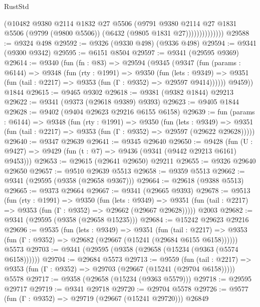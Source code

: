 \begin{lexlean}{RustStd}
\begin{coremodule}
                        (@10482
                          @9380
                          @2114
                          @1832
                          @27
                          @5506
                          (@9791
                            @9380
                            @2114
                            @27
                            @1831
                            @5506
                            (@9799 (@9800 @5506))
                            (@6432 (@9805 @1831 @27))))))))))))))
@29588 := @9324 @498
@29592 := @9326 (@9330 @498) (@9336 @498)
@29594 := @9341 (@9300 @9342)
@29595 := @6151 @8504
@29597 := @9341 (@29595 @9369)
@29614 := @9340
    (fun (fn : @83) =>
    @29594
      (@9345
        (@9347
          (fun (params : @6144) =>
          @9348
            (fun (rty : @1991) =>
            @9350
              (fun (lets : @9349) =>
              @9351 (fun (tail : @2217) => @9353 (fun (Γ : @9352) => @29597 @9414))))))
        @9459))
    @1844
@29615 := @9465 @9302
@29618 := @9381 (@9382 @1844) @29213
@29622 := @9341 (@9373 (@29618 @9389) @9393)
@29623 := @9405 @1844
@29628 := @9402 (@9404 @29623 @29216 @6155 @6158)
@29639 := fun (params : @6144) =>
  @9348
    (fun (rty : @1991) =>
    @9350
      (fun (lets : @9349) =>
      @9351 (fun (tail : @2217) => @9353 (fun (Γ : @9352) => @29597 (@29622 @29628)))))
@29640 := @9347 @29639
@29641 := @9345 @29640
@29650 := @9428
    (fun (U : @9427) => @9429 (fun (t : @7) => @9436 (@9341 (@9442 @29213 @6161) @9453)))
@29653 := @29615 (@29641 @29650) @29211
@29655 := @9326 @29640 @29650
@29657 := @9510 @29639 @5513
@29658 := @9359 @5513
@29662 := @9341 (@29595 (@9358 (@29658 @9367)))
@29664 := @29618 (@9388 @5513)
@29665 := @9373 @29664
@29667 := @9341 (@29665 @9393)
@29678 := @9513
    (fun (rty : @1991) =>
    @9350
      (fun (lets : @9349) =>
      @9351 (fun (tail : @2217) => @9353 (fun (Γ : @9352) => @29662 (@29667 @29628)))))
    @2003
@29682 := @9341 (@29595 (@9358 (@29658 @15235)))
@29684 := @15242 @29623 @29216
@29696 := @9535
    (fun (lets : @9349) =>
    @9351
      (fun (tail : @2217) =>
      @9353 (fun (Γ : @9352) => @29682 (@29667 (@15241 (@29684 @6155 @6158))))))
    @5573
@29703 := @9341 (@29595 (@9358 (@29658 (@15234 (@9363 (@5574 @6158))))))
@29704 := @29684 @5573
@29713 := @9559
    (fun (tail : @2217) => @9353 (fun (Γ : @9352) => @29703 (@29667 (@15241 (@29704 @6158)))))
    @5578
@29717 := @9358 (@29658 (@15234 (@9363 @5579)))
@29718 := @29595 @29717
@29719 := @9341 @29718
@29720 := @29704 @5578
@29726 := @9577 (fun (Γ : @9352) => @29719 (@29667 (@15241 @29720))) @26849

\end{coremodule}
\end{lexlean}
